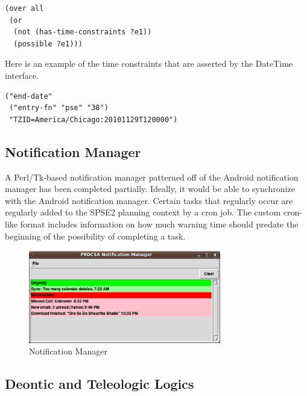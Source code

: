 \documentclass[letterpaper]{article}
\begin{document}
\begin{footnotesize}
\begin{verbatim}
(over all
 (or
  (not (has-time-constraints ?e1))
  (possible ?e1)))
\end{verbatim}
\end{footnotesize}

\noindent Here is an example of the time constraints that are asserted
by the DateTime interface.

\begin{footnotesize}
\begin{verbatim}
("end-date"
 ("entry-fn" "pse" "38")
 "TZID=America/Chicago:20101129T120000")
\end{verbatim}
\end{footnotesize}

\subsection{Notification Manager}

\noindent A Perl/Tk-based notification manager patterned off of the
Android notification manager has been completed partially.  Ideally,
it would be able to synchronize with the Android notification manager.
Certain tasks that regularly occur are regularly added to the SPSE2
planning context by a cron job.  The custom cron-like format includes
information on how much warning time should predate the beginning of
the possibility of completing a task.

\begin{figure}[h!]
  \centering
  \includegraphics[width=84mm]{images/ps/notification-manager.ps}
  \caption{Notification Manager}
\end{figure}


\subsection{Deontic and Teleologic Logics}
\end{document}
